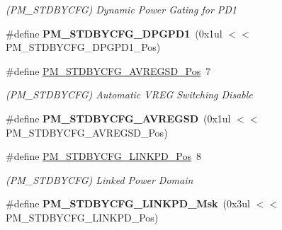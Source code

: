 \begin{DoxyCompactItemize}
\begin{DoxyCompactList}\small\item\em (P\+M\+\_\+\+S\+T\+D\+B\+Y\+C\+F\+G) Dynamic Power Gating for P\+D1 \end{DoxyCompactList}\item 
\hypertarget{group___s_a_m_l21___p_m_ga5d8618931b2e20ce3d682e71362ff439}{}\#define {\bfseries P\+M\+\_\+\+S\+T\+D\+B\+Y\+C\+F\+G\+\_\+\+D\+P\+G\+P\+D1}~(0x1ul $<$$<$ P\+M\+\_\+\+S\+T\+D\+B\+Y\+C\+F\+G\+\_\+\+D\+P\+G\+P\+D1\+\_\+\+Pos)\label{group___s_a_m_l21___p_m_ga5d8618931b2e20ce3d682e71362ff439}

\item 
\hypertarget{group___s_a_m_l21___p_m_gae51250c7d22ea818cfa5ae08400f4e84}{}\#define \hyperlink{group___s_a_m_l21___p_m_gae51250c7d22ea818cfa5ae08400f4e84}{P\+M\+\_\+\+S\+T\+D\+B\+Y\+C\+F\+G\+\_\+\+A\+V\+R\+E\+G\+S\+D\+\_\+\+Pos}~7\label{group___s_a_m_l21___p_m_gae51250c7d22ea818cfa5ae08400f4e84}

\begin{DoxyCompactList}\small\item\em (P\+M\+\_\+\+S\+T\+D\+B\+Y\+C\+F\+G) Automatic V\+R\+E\+G Switching Disable \end{DoxyCompactList}\item 
\hypertarget{group___s_a_m_l21___p_m_gad2ee4c725ce463765082a1564d2bee40}{}\#define {\bfseries P\+M\+\_\+\+S\+T\+D\+B\+Y\+C\+F\+G\+\_\+\+A\+V\+R\+E\+G\+S\+D}~(0x1ul $<$$<$ P\+M\+\_\+\+S\+T\+D\+B\+Y\+C\+F\+G\+\_\+\+A\+V\+R\+E\+G\+S\+D\+\_\+\+Pos)\label{group___s_a_m_l21___p_m_gad2ee4c725ce463765082a1564d2bee40}

\item 
\hypertarget{group___s_a_m_l21___p_m_ga08472f29227e219ca4aad41678bc52b1}{}\#define \hyperlink{group___s_a_m_l21___p_m_ga08472f29227e219ca4aad41678bc52b1}{P\+M\+\_\+\+S\+T\+D\+B\+Y\+C\+F\+G\+\_\+\+L\+I\+N\+K\+P\+D\+\_\+\+Pos}~8\label{group___s_a_m_l21___p_m_ga08472f29227e219ca4aad41678bc52b1}

\begin{DoxyCompactList}\small\item\em (P\+M\+\_\+\+S\+T\+D\+B\+Y\+C\+F\+G) Linked Power Domain \end{DoxyCompactList}\item 
\hypertarget{group___s_a_m_l21___p_m_ga6fafd61d6711c3ec8ed07ebc0634db5b}{}\#define {\bfseries P\+M\+\_\+\+S\+T\+D\+B\+Y\+C\+F\+G\+\_\+\+L\+I\+N\+K\+P\+D\+\_\+\+Msk}~(0x3ul $<$$<$ P\+M\+\_\+\+S\+T\+D\+B\+Y\+C\+F\+G\+\_\+\+L\+I\+N\+K\+P\+D\+\_\+\+Pos)\label{group___s_a_m_l21___p_m_ga6fafd61d6711c3ec8ed07ebc0634db5b}


\end{DoxyCompactItemize}
